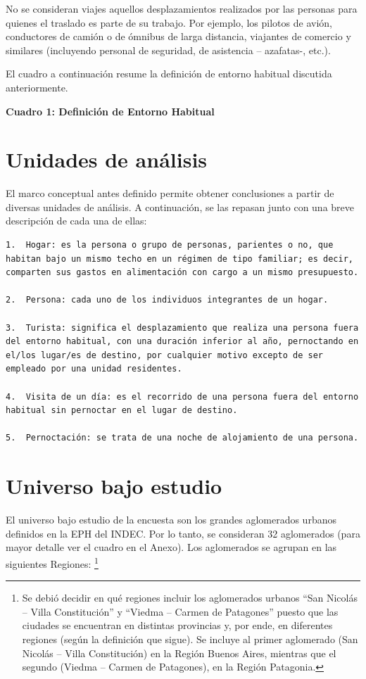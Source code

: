 \documentclass[
  openany]{book}
\begin{document}
No se consideran viajes aquellos desplazamientos realizados por las personas para quienes el traslado es parte de su trabajo. Por ejemplo, los pilotos de avión, conductores de camión o de ómnibus de larga distancia, viajantes de comercio y similares (incluyendo personal de seguridad, de asistencia -- azafatas-, etc.).

El cuadro a continuación resume la definición de entorno habitual discutida anteriormente.

\textbf{Cuadro 1: Definición de Entorno Habitual}

\hypertarget{unidades-de-anuxe1lisis}{%
\section{Unidades de análisis}\label{unidades-de-anuxe1lisis}}

El marco conceptual antes definido permite obtener conclusiones a partir de diversas unidades de análisis. A continuación, se las repasan junto con una breve descripción de cada una de ellas:

\begin{verbatim}
1.  Hogar: es la persona o grupo de personas, parientes o no, que habitan bajo un mismo techo en un régimen de tipo familiar; es decir, comparten sus gastos en alimentación con cargo a un mismo presupuesto.

2.  Persona: cada uno de los individuos integrantes de un hogar.

3.  Turista: significa el desplazamiento que realiza una persona fuera del entorno habitual, con una duración inferior al año, pernoctando en el/los lugar/es de destino, por cualquier motivo excepto de ser empleado por una unidad residentes.

4.  Visita de un día: es el recorrido de una persona fuera del entorno habitual sin pernoctar en el lugar de destino.

5.  Pernoctación: se trata de una noche de alojamiento de una persona.
\end{verbatim}

\hypertarget{universo-bajo-estudio}{%
\section{Universo bajo estudio}\label{universo-bajo-estudio}}

El universo bajo estudio de la encuesta son los grandes aglomerados urbanos definidos en la EPH del INDEC. Por lo tanto, se consideran 32 aglomerados (para mayor detalle ver el cuadro en el Anexo). Los aglomerados se agrupan en las siguientes Regiones: \footnote{Se debió decidir en qué regiones incluir los aglomerados urbanos ``San Nicolás -- Villa Constitución'' y ``Viedma -- Carmen de Patagones'' puesto que las ciudades se encuentran en distintas provincias y, por ende, en diferentes regiones (según la definición que sigue). Se incluye al primer aglomerado (San Nicolás -- Villa Constitución) en la Región Buenos Aires, mientras que el segundo (Viedma -- Carmen de Patagones), en la Región Patagonia.}
\end{document}
